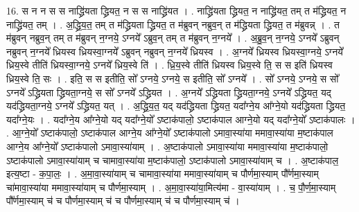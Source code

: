 \documentclass[17pt]{extarticle}
\begin{document}
16. स न न स स नाद्ध्रि॑यता द्ध्रियत॒ न स स नाद्ध्रि॑यत । . नाद्ध्रि॑यता द्ध्रियत॒ न नाद्ध्रि॑यत॒ तम् त म॑द्ध्रियत॒ न नाद्ध्रि॑यत॒ तम् । . अ॒द्ध्रि॒य॒त॒ तम् त म॑द्ध्रियता द्ध्रियत॒ त म॑ब्रुवन् नब्रुव॒न् त म॑द्ध्रियता द्ध्रियत॒ त म॑ब्रुवन्न् । . त म॑ब्रुवन् नब्रुव॒न् तम् त म॑ब्रुवन् न॒ग्नये॒ ऽग्नये᳚ ऽब्रुव॒न् तम् त म॑ब्रुवन् न॒ग्नये᳚ । . अ॒ब्रु॒व॒न् न॒ग्नये॒ ऽग्नये᳚ ऽब्रुवन् नब्रुवन् न॒ग्नये᳚ ध्रियस्व ध्रियस्वा॒ग्नये᳚ ऽब्रुवन् नब्रुवन् न॒ग्नये᳚ ध्रियस्व । . अ॒ग्नये᳚ ध्रियस्व ध्रियस्वा॒ग्नये॒ ऽग्नये᳚ ध्रिय॒स्वे तीति॑ ध्रियस्वा॒ग्नये॒ ऽग्नये᳚ ध्रिय॒स्वे ति॑ । . ध्रि॒य॒स्वे तीति॑ ध्रियस्व ध्रिय॒स्वे ति॒ स स इति॑ ध्रियस्व ध्रिय॒स्वे ति॒ सः । . इति॒ स स इतीति॒ सो᳚ ऽग्नये॒ ऽग्नये॒ स इतीति॒ सो᳚ ऽग्नये᳚ । . सो᳚ ऽग्नये॒ ऽग्नये॒ स सो᳚ ऽग्नये᳚ ऽद्ध्रियता द्ध्रियता॒ग्नये॒ स सो᳚ ऽग्नये᳚ ऽद्ध्रियत । . अ॒ग्नये᳚ ऽद्ध्रियता द्ध्रियता॒ग्नये॒ ऽग्नये᳚ ऽद्ध्रियत॒ यद् यद॑द्ध्रियता॒ग्नये॒ ऽग्नये᳚ ऽद्ध्रियत॒ यत् । . अ॒द्ध्रि॒य॒त॒ यद् यद॑द्ध्रियता द्ध्रियत॒ यदा᳚ग्ने॒य आ᳚ग्ने॒यो यद॑द्ध्रियता द्ध्रियत॒ यदा᳚ग्ने॒यः । . यदा᳚ग्ने॒य आ᳚ग्ने॒यो यद् यदा᳚ग्ने॒यो᳚ ऽष्टाक॑पालो॒ ऽष्टाक॑पाल आग्ने॒यो यद् यदा᳚ग्ने॒यो᳚ ऽष्टाक॑पालः । . आ॒ग्ने॒यो᳚ ऽष्टाक॑पालो॒ ऽष्टाक॑पाल आग्ने॒य आ᳚ग्ने॒यो᳚ ऽष्टाक॑पालो ऽमावा॒स्या॑या ममावा॒स्या॑या म॒ष्टाक॑पाल आग्ने॒य आ᳚ग्ने॒यो᳚ ऽष्टाक॑पालो ऽमावा॒स्या॑याम् । . अ॒ष्टाक॑पालो ऽमावा॒स्या॑या ममावा॒स्या॑या म॒ष्टाक॑पालो॒ ऽष्टाक॑पालो ऽमावा॒स्या॑याम् च चामावा॒स्या॑या म॒ष्टाक॑पालो॒ ऽष्टाक॑पालो ऽमावा॒स्या॑याम् च । . अ॒ष्टाक॑पाल॒ इत्य॒ष्टा - क॒पा॒लः॒ । . अ॒मा॒वा॒स्या॑याम् च चामावा॒स्या॑या ममावा॒स्या॑याम् च पौर्णमा॒स्याम् पौ᳚र्णमा॒स्याम् चा॑मावा॒स्या॑या ममावा॒स्या॑याम् च पौर्णमा॒स्याम् । . अ॒मा॒वा॒स्या॑या॒मित्य॑मा - वा॒स्या॑याम् । . च॒ पौ॒र्ण॒मा॒स्याम् पौ᳚र्णमा॒स्याम् च॑ च पौर्णमा॒स्याम् च॑ च पौर्णमा॒स्याम् च॑ च पौर्णमा॒स्याम् च॑ । \newline
\end{document}

